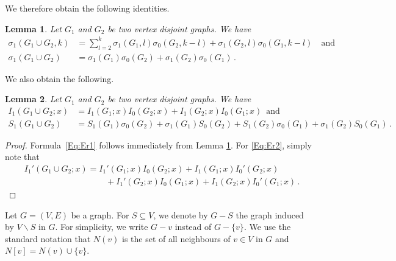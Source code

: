\documentclass[a4paper,12pt]{amsart}
\newtheorem{lemma}{Lemma}
\theoremstyle{remark}
\begin{document}
We therefore obtain the following identities.

\begin{lemma}
\label{Lem:1}
Let $G_1$ and $G_2$ be two vertex disjoint graphs. We have
\begin{align*}
 \sigma_1(G_1 \cup G_2,k)&= \sum_{l=2}^k \sigma_1(G_1,l) \sigma_0(G_2,k-l)  +\sigma_1(G_2,l) \sigma_0(G_1,k-l) \quad \text{and}\\
 \sigma_1(G_1 \cup G_2)&= \sigma_1(G_1) \sigma_0(G_2) + \sigma_1(G_2) \sigma_0(G_1)\,.
\end{align*}
\end{lemma}

\medskip 

We also obtain the following.
\begin{lemma}\label{G1UnionG2}
Let $G_1$ and $G_2$ be two vertex disjoint graphs. We have
\begin{align}
\label{Eq:Er1}
  I_1(G_1 \cup G_2;x)&=I_1(G_1;x)I_0(G_2;x)+I_1(G_2;x)I_0(G_1;x)\,\text{ and }\\
  \label{Eq:Er2}
 S_1(G_1 \cup G_2)&=S_1(G_1)\sigma_0(G_2)+\sigma_1(G_1)S_0(G_2) + S_1(G_2)\sigma_0(G_1)+\sigma_1(G_2)S_0(G_1)  \,.
\end{align}
\end{lemma}

\begin{proof}
Formula~\eqref{Eq:Er1} follows immediately from Lemma \ref{Lem:1}. For \eqref{Eq:Er2},
simply note that 
 \begin{align*}
  &I_1'(G_1 \cup G_2;x)=I_1'(G_1;x)I_0(G_2;x)+ I_1(G_1;x)I_0'(G_2;x) \\
  & \hspace{4cm} +I_1'(G_2;x)I_0(G_1;x) + I_1(G_2;x)I_0'(G_1;x) \,.
 \end{align*}
 \end{proof}

\medskip
Let $G=(V,E)$ be a graph. For $S\subseteq V$, we denote by $G-S$ the graph induced by $V\backslash S$ in $G$. For simplicity, we write $G-v$ instead of $G-\{v\}$. We use the standard notation that $N(v)$ is the set of all neighbours of $v\in V$ in $G$ and $N[v]=N(v)\cup \{v\}$.
\end{document}
